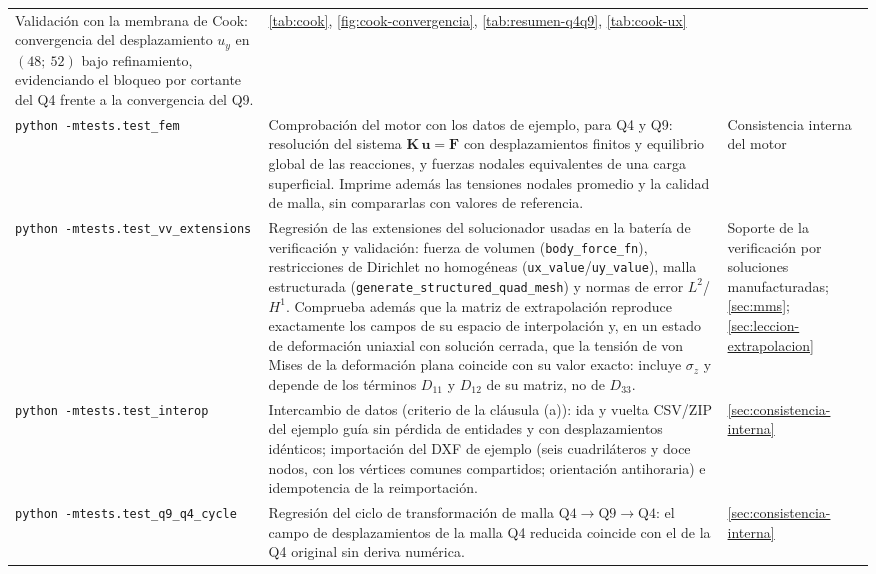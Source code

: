 {\begin{longtable}{@{}>{\footnotesize\raggedright\arraybackslash}p{4.3cm} >{\footnotesize\raggedright\arraybackslash}p{5.1cm} >{\footnotesize\raggedright\arraybackslash}p{4.1cm}@{}}
Validación con la membrana de Cook: convergencia del desplazamiento $u_y$ en $(48;\ 52)$ bajo refinamiento, evidenciando el bloqueo por cortante del Q4 frente a la convergencia del Q9. &
\autoref{tab:cook}, \autoref{fig:cook-convergencia}, \autoref{tab:resumen-q4q9}, \autoref{tab:cook-ux} \\
\addlinespace
\texttt{python -m}\newline\texttt{tests.test\_fem} &
Comprobación del motor con los datos de ejemplo, para Q4 y Q9: resolución del sistema $\bm{K}\,\bm{u}=\bm{F}$ con desplazamientos finitos y equilibrio global de las reacciones, y fuerzas nodales equivalentes de una carga superficial. Imprime además las tensiones nodales promedio y la calidad de malla, sin compararlas con valores de referencia. &
Consistencia interna del motor \\
\addlinespace
\texttt{python -m}\newline\texttt{tests.test\_vv\_extensions} &
Regresión de las extensiones del solucionador usadas en la batería de verificación y validación: fuerza de volumen (\texttt{body\_force\_fn}), restricciones de Dirichlet no homogéneas (\texttt{ux\_value}/\texttt{uy\_value}), malla estructurada (\texttt{generate\_structured\_quad\_mesh}) y normas de error $L^2$/$H^1$. Comprueba además que la matriz de extrapolación reproduce exactamente los campos de su espacio de interpolación y, en un estado de deformación uniaxial con solución cerrada, que la tensión de von Mises de la deformación plana coincide con su valor exacto: incluye $\sigma_z$ y depende de los términos $D_{11}$ y $D_{12}$ de su matriz, no de $D_{33}$. &
Soporte de la verificación por soluciones manufacturadas; \autoref{sec:mms}; \autoref{sec:leccion-extrapolacion} \\
\addlinespace
\texttt{python -m}\newline\texttt{tests.test\_interop} &
Intercambio de datos (criterio de la cláusula (a)): ida y vuelta CSV/ZIP del ejemplo guía sin pérdida de entidades y con desplazamientos idénticos; importación del DXF de ejemplo (seis cuadriláteros y doce nodos, con los vértices comunes compartidos; orientación antihoraria) e idempotencia de la reimportación. &
\autoref{sec:consistencia-interna} \\
\addlinespace
\texttt{python -m}\newline\texttt{tests.test\_q9\_q4\_cycle} &
Regresión del ciclo de transformación de malla $\text{Q4}\rightarrow\text{Q9}\rightarrow\text{Q4}$: el campo de desplazamientos de la malla Q4 reducida coincide con el de la Q4 original sin deriva numérica. &
\autoref{sec:consistencia-interna} \\
\end{longtable}}

